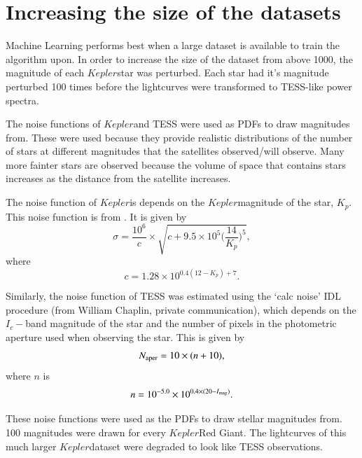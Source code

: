 \documentclass[a4paper,fleqn,usenatbib,useAMS]{mnras}
\newcommand{\kep}{\ensuremath{Kepler}\:}
\begin{document}
\section{Increasing the size of the datasets}
\label{sect: size}

Machine Learning performs best when a large dataset is available to train the algorithm upon. In order to increase the size of the dataset from \citet{davies_asteroseismology_2016} above 1000, the magnitude of each \kep star was perturbed. Each star had it's magnitude perturbed 100 times before the lightcurves were transformed to TESS-like power spectra. 

The noise functions of \kep and TESS were used as PDFs to draw magnitudes from. These were used because they provide realistic distributions of the number of stars at different magnitudes that the satellites observed/will observe. Many more fainter stars are observed because the volume of space that contains stars increases as the distance from the satellite increases.

The noise function of \kep is depends on the \kep magnitude of the star, $K_{p}$. This noise function is from \citet{chaplin_predicting_2011}. It is given by
\begin{equation}
\sigma = \frac{10^{6}}{c} \times \sqrt{c+9.5 \times 10^{5}\Bigg(\frac{14}{K_{p}}\Bigg)^{5}} ,
\label{eq:kep noise}
\end{equation}
where
\begin{equation}
c = 1.28 \times 10^{0.4(12-K_{p})+7} .
\end{equation}

Similarly, the noise function of TESS was estimated using the `calc noise' IDL procedure (from William Chaplin, private communication), which depends on the $I_{c}-$band magnitude of the star and the number of pixels in the photometric aperture used when observing the star. This is given by
\begin{equation}
N_{\rm aper} = 10 \times (n+10) , 
\end{equation}
where $n$ is
\begin{equation}
\label{eq:tess noise}
n = 10^{-5.0} \times 10^{ 0.4 \times (20-I_{\rm mag})} .
\end{equation}

These noise functions were used as the PDFs to draw stellar magnitudes from. 100 magnitudes were drawn for every \kep Red Giant. The lightcurves of this much larger \kep dataset were degraded to look like TESS observations.
\end{document}
